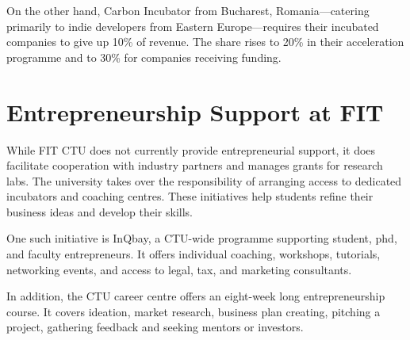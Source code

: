 On the other hand, Carbon Incubator from Bucharest, Romania---catering primarily to indie developers from Eastern Europe---requires their incubated companies to give up 10\% of revenue. The share rises to 20\% in their acceleration programme and to 30\% for companies receiving funding.
\cite{strategy-incubation}

\section{Entrepreneurship Support at FIT}
While FIT CTU does not currently provide entrepreneurial support, it does facilitate cooperation with industry partners and manages grants for research labs. The university takes over the responsibility of arranging access to dedicated incubators and coaching centres. These initiatives help students refine their business ideas and develop their skills.
\cite{fit-rozvoj}

One such initiative is InQbay, a CTU-wide programme supporting student, phd, and faculty entrepreneurs. It offers individual coaching, workshops, tutorials, networking events, and access to legal, tax, and marketing consultants.
\cite{inqbay}

In addition, the CTU career centre offers an eight-week long entrepreneurship course. It covers ideation, market research, business plan creating, pitching a project, gathering feedback and seeking mentors or investors.
\cite{kc_podnikni-to}